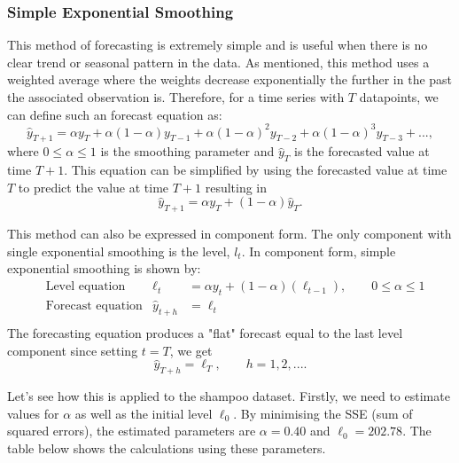 \documentclass{article}
\begin{document}
  \subsubsection{Simple Exponential Smoothing}
  This method of forecasting is extremely simple and is useful when there is no clear trend or seasonal pattern in the data. As mentioned, this method uses a weighted average where the weights decrease exponentially the further in the past the associated observation is. Therefore, for a time series with $T$ datapoints, we can define such an forecast equation as:
  \begin{equation*}
    \hat{y}_{T+1} = \alpha y_T + \alpha(1-\alpha)y_{T-1} + \alpha(1-\alpha)^2y_{T-2} + \alpha(1-\alpha)^3y_{T-3} + ...,
  \end{equation*}
  where $0 \le \alpha \le 1$ is the smoothing parameter and $\hat{y}_{T}$ is the forecasted value at time $T+1$. This equation can be simplified by using the forecasted value at time $T$ to predict the value at time $T+1$ resulting in
  \begin{equation*}
    \hat{y}_{T+1} = \alpha y_T + (1-\alpha)\hat{y}_{T}.
  \end{equation*}

  This method can also be expressed in component form. The only component with single exponential smoothing is the level, $l_t$. In component form, simple exponential smoothing is shown by:
  \begin{align*}
    & \text{Level equation} & \ell_t &= \alpha y_t + (1-\alpha)(\ell_{t-1}), \qquad 0 \le \alpha \le 1  \\
    & \text{Forecast equation} & \hat{y}_{t+h} &= \ell_t \\
  \end{align*}
  The forecasting equation produces a "flat" forecast equal to the last level component since setting $t=T$, we get
  \begin{equation*}
    \hat{y}_{T+h} = \ell_T, \qquad h=1,2,....
  \end{equation*}
  
  Let's see how this is applied to the shampoo dataset. Firstly, we need to estimate values for $\alpha$ as well as the initial level $\ell_0$. By minimising the SSE (sum of squared errors), the estimated parameters are $\alpha=0.40$ and $\ell_0=202.78$. The table below shows the calculations using these parameters.
\end{document}
